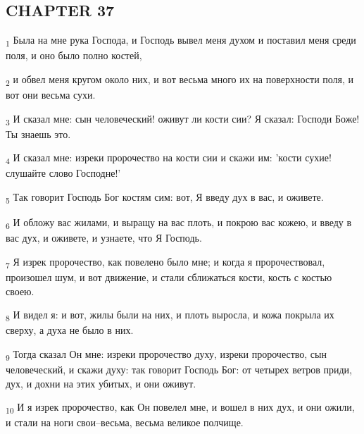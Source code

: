\subsection{CHAPTER 37}
\begin{tcolorbox}
\textsubscript{1} Была на мне рука Господа, и Господь вывел меня духом и поставил меня среди поля, и оно было полно костей,
\end{tcolorbox}
\begin{tcolorbox}
\textsubscript{2} и обвел меня кругом около них, и вот весьма много их на поверхности поля, и вот они весьма сухи.
\end{tcolorbox}
\begin{tcolorbox}
\textsubscript{3} И сказал мне: сын человеческий! оживут ли кости сии? Я сказал: Господи Боже! Ты знаешь это.
\end{tcolorbox}
\begin{tcolorbox}
\textsubscript{4} И сказал мне: изреки пророчество на кости сии и скажи им: 'кости сухие! слушайте слово Господне!'
\end{tcolorbox}
\begin{tcolorbox}
\textsubscript{5} Так говорит Господь Бог костям сим: вот, Я введу дух в вас, и оживете.
\end{tcolorbox}
\begin{tcolorbox}
\textsubscript{6} И обложу вас жилами, и выращу на вас плоть, и покрою вас кожею, и введу в вас дух, и оживете, и узнаете, что Я Господь.
\end{tcolorbox}
\begin{tcolorbox}
\textsubscript{7} Я изрек пророчество, как повелено было мне; и когда я пророчествовал, произошел шум, и вот движение, и стали сближаться кости, кость с костью своею.
\end{tcolorbox}
\begin{tcolorbox}
\textsubscript{8} И видел я: и вот, жилы были на них, и плоть выросла, и кожа покрыла их сверху, а духа не было в них.
\end{tcolorbox}
\begin{tcolorbox}
\textsubscript{9} Тогда сказал Он мне: изреки пророчество духу, изреки пророчество, сын человеческий, и скажи духу: так говорит Господь Бог: от четырех ветров приди, дух, и дохни на этих убитых, и они оживут.
\end{tcolorbox}
\begin{tcolorbox}
\textsubscript{10} И я изрек пророчество, как Он повелел мне, и вошел в них дух, и они ожили, и стали на ноги свои--весьма, весьма великое полчище.
\end{tcolorbox}
